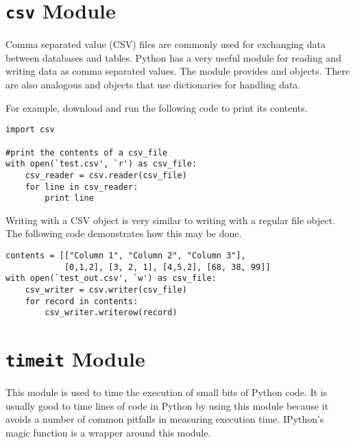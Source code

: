 \section*{\texttt{csv} Module}
Comma separated value (CSV) files are commonly used for exchanging data between databases and tables. 
Python has a very useful module for reading and writing data as comma separated values.
The  module provides  and  objects.
There are also analogous  and  objects that use dictionaries for handling data.

For example, download  and run the following code to print its contents.
\begin{lstlisting}
import csv

#print the contents of a csv_file
with open(`test.csv', `r') as csv_file:
    csv_reader = csv.reader(csv_file)
    for line in csv_reader:
        print line
\end{lstlisting}

Writing with a CSV  object is very similar to writing with a regular file object.
The following code demonstrates how this may be done.
\begin{lstlisting}
contents = [["Column 1", "Column 2", "Column 3"],
            [0,1,2], [3, 2, 1], [4,5,2], [68, 38, 99]]
with open(`test_out.csv', `w') as csv_file:
    csv_writer = csv.writer(csv_file)
    for record in contents:
        csv_writer.writerow(record)
\end{lstlisting}

\section*{\texttt{timeit} Module}
This module is used to time the execution of small bits of Python code.
It is usually good to time lines of code in Python by using this module because it avoids a number of common pitfalls in measuring execution time.
IPython's  magic function is a wrapper around this module.

